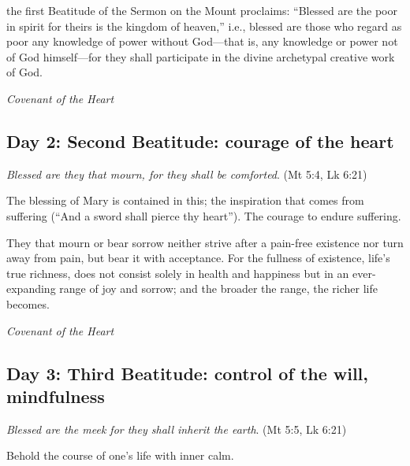 \begin{quotationx}
the first Beatitude of the Sermon on the Mount proclaims: “Blessed are the poor in spirit for theirs is the kingdom of
heaven,” i.e., blessed are those who regard as poor any knowledge of power without God—that is,
any knowledge or power not of God himself—for they shall participate in the divine archetypal
creative work of God. 
\begin{flushright}\textit{Covenant of the Heart}\end{flushright}

\end{quotationx}
\subsection*{Day 2: Second Beatitude: courage of the heart}
\emph{Blessed are they that mourn, for they shall be comforted}. (Mt 5:4, Lk 6:21)

The blessing of Mary is contained in this; the inspiration that comes from suffering (“And a sword shall pierce thy
heart”). The courage to endure suffering.

\begin{quotationx}
They that mourn or bear sorrow neither strive after a pain-free existence nor turn away from pain, but bear it with
acceptance. For the fullness of existence, life's true richness, does not consist solely in health
and happiness but in an ever-expanding range of joy and sorrow; and the broader the range, the richer life becomes.
\begin{flushright}\textit{Covenant of the Heart}\end{flushright}

\end{quotationx}
\subsection*{Day 3: Third Beatitude: control of the will, mindfulness}
\emph{Blessed are the meek for they shall inherit the earth}. (Mt 5:5, Lk 6:21)

Behold the course of one's life with inner calm.

